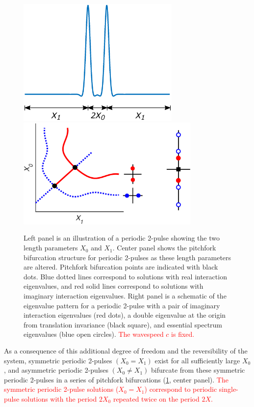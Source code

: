 \documentclass[12pt]{elsarticle}
\theoremstyle{plain}
\theoremstyle{definition}
\theoremstyle{remark}
\numberwithin{theorem}{section}
\numberwithin{equation}{section}
\newcommand{\revised}[1]{ \textcolor{red}{#1} }
\begin{document}
\begin{figure}
\begin{center}
\includegraphics[width=8cm]{images/DPperiodic.eps} \hspace{-1cm}
\includegraphics[width=9cm]{images/2pitchforkcoloreig2.eps}
\end{center}
\caption{Left panel is an illustration of a periodic 2-pulse showing the two length parameters $X_0$ and $X_1$. Center panel shows the pitchfork bifurcation structure for periodic 2-pulses as these length parameters are altered. Pitchfork bifurcation points are indicated with black dots. Blue dotted lines correspond to solutions with real interaction eigenvalues, and red solid lines correspond to solutions with imaginary interaction eigenvalues. Right panel is a schematic of the eigenvalue pattern for a periodic 2-pulse with a pair of imaginary interaction eigenvalues (red dots), a double eigenvalue at the origin from translation invariance (black square), and essential spectrum eigenvalues (blue open circles). \revised{The wavespeed $c$ is fixed.}}
\label{fig:KdV5periodicMP}
\end{figure}

As a consequence of this additional degree of freedom and the reversibility of the system, symmetric periodic 2-pulses $(X_0 = X_1)$ exist for all sufficiently large $X_0$, and asymmetric periodic 2-pulses $(X_0 \neq X_1)$ bifurcate from these symmetric periodic 2-pulses in a series of pitchfork bifurcations (\cref{fig:KdV5periodicMP}, center panel).
\revised{
The symmetric periodic 2-pulse solutions ($X_0 = X_1$) correspond to periodic single-pulse solutions with the period $2X_0$ repeated twice on the period $2X$. 
}
\end{document}
